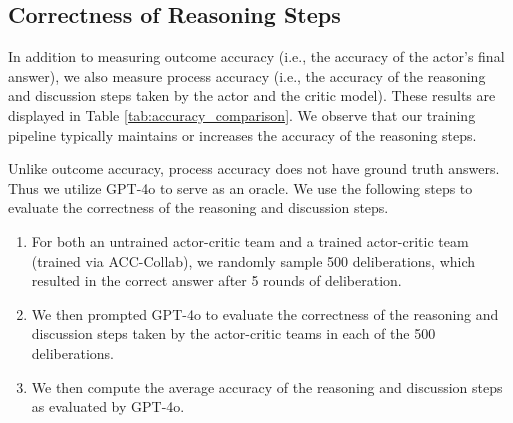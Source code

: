 \subsection{Correctness of Reasoning Steps}\label{Sup:reason}

In addition to measuring outcome accuracy (i.e., the accuracy of the actor's final answer), we also measure process accuracy (i.e., the accuracy of the reasoning and discussion steps taken by the actor and the critic model). These results are displayed in Table \ref{tab:accuracy_comparison}. We observe that our training pipeline typically maintains or increases the accuracy of the reasoning steps.

Unlike outcome accuracy, process accuracy does not have ground truth answers. Thus we utilize GPT-4o to serve as an oracle.
We use the following steps to evaluate the correctness of the reasoning and discussion steps.
\begin{enumerate}
    \item For both an untrained actor-critic team and a trained actor-critic team (trained via ACC-Collab), we randomly sample 500 deliberations, which resulted in the correct answer after 5 rounds of deliberation. 
    \item We then prompted GPT-4o to evaluate the correctness of the reasoning and discussion steps taken by the actor-critic teams in each of the 500 deliberations. 
    \item We then compute the average accuracy of the reasoning and discussion steps as evaluated by GPT-4o.
\end{enumerate}


